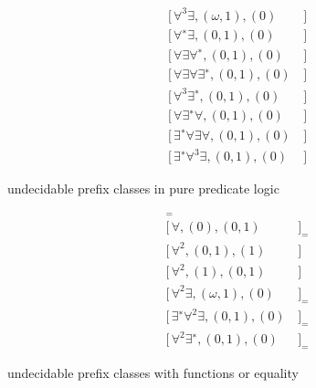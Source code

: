 

\begin{table}[hbt]
		\begin{align*}
		[\,\forall\exists\forall, (\omega, 1), (0)&\,] \tag{Kahr 1962}
		\\
		[\,\forall^3 \exists, (\omega, 1), (0)&\,] \tag{Surányi 1959}
		\\
		[\,\forall^{∗} \exists, (0, 1), (0)&\,] \tag{Kalmár-Surányi 1950}
		\\
		[\,\forall\exists\forall^{∗} , (0, 1), (0)&\,]  \tag{Denton 1960}
		\\
		[\,\forall\exists\forall\exists^{∗}, (0, 1), (0)&\,] \tag{Gurevich 1966}
		\\
		[\,\forall^3 \exists^{∗} , (0, 1), (0)&\,] \tag{Kalmár-Surányi 1947}
		\\
		[\,\forall\exists^{∗} \forall, (0, 1), (0)&\,] \tag{Kostyrko-Genenz 1964}
		\\
		[\,\exists^{∗} \forall\exists\forall, (0, 1), (0)&\,] \tag{Surányi 1959}
		\\
		[\,\exists^{∗} \forall^3 \exists, (0, 1), (0)&\,] \tag{Surányi 1959}
		\end{align*}
		\caption{undecidable prefix classes in pure predicate logic}
	\end{table}

	\begin{table}[hbt]
	\begin{align*}
	[\,\forall, (0), (2)&\,]_{=} \tag{Gurevich 1976}
	\\
	[\,\forall, (0), (0, 1)&\,]_{=} \tag{Gurevich 1976}
	\\
	[\,\forall^2 , (0, 1), (1)&\,] \tag{Gurevich 1969}
	\\
	[\,\forall^2 , (1), (0, 1)&\,] \tag{Gurevich 1969}
	\\
	[\,\forall^2\exists, (\omega, 1), (0)&\,]_{=} \tag{Goldfarb 1984}
	\\
	[\,\exists^{∗}\forall^2\exists, (0, 1), (0)&\,]_{=} \tag{Goldfarb 1984}
	\\
	[\,\forall^2\exists^{∗}, (0, 1), (0)&\,]_{=} \tag{Goldfarb 1984}
	\end{align*}
	\caption{undecidable prefix classes with functions or equality}
\end{table}

